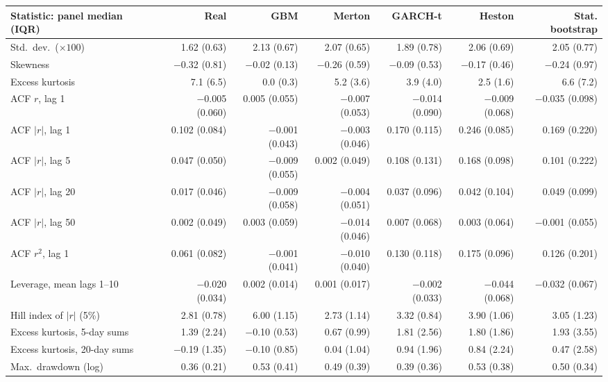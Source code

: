 \begin{tabular}{lrrrrrr}
\toprule
Statistic: panel median (IQR) & Real & GBM & Merton & GARCH-t & Heston & Stat. bootstrap \\
\midrule
Std.\ dev.\ ($\times 100$) & 1.62 (0.63) & 2.13 (0.67) & 2.07 (0.65) & 1.89 (0.78) & 2.06 (0.69) & 2.05 (0.77) \\
Skewness & $-$0.32 (0.81) & $-$0.02 (0.13) & $-$0.26 (0.59) & $-$0.09 (0.53) & $-$0.17 (0.46) & $-$0.24 (0.97) \\
Excess kurtosis & 7.1 (6.5) & 0.0 (0.3) & 5.2 (3.6) & 3.9 (4.0) & 2.5 (1.6) & 6.6 (7.2) \\
ACF $r$, lag 1 & $-$0.005 (0.060) & 0.005 (0.055) & $-$0.007 (0.053) & $-$0.014 (0.090) & $-$0.009 (0.068) & $-$0.035 (0.098) \\
ACF $|r|$, lag 1 & 0.102 (0.084) & $-$0.001 (0.043) & $-$0.003 (0.046) & 0.170 (0.115) & 0.246 (0.085) & 0.169 (0.220) \\
ACF $|r|$, lag 5 & 0.047 (0.050) & $-$0.009 (0.055) & 0.002 (0.049) & 0.108 (0.131) & 0.168 (0.098) & 0.101 (0.222) \\
ACF $|r|$, lag 20 & 0.017 (0.046) & $-$0.009 (0.058) & $-$0.004 (0.051) & 0.037 (0.096) & 0.042 (0.104) & 0.049 (0.099) \\
ACF $|r|$, lag 50 & 0.002 (0.049) & 0.003 (0.059) & $-$0.014 (0.046) & 0.007 (0.068) & 0.003 (0.064) & $-$0.001 (0.055) \\
ACF $r^2$, lag 1 & 0.061 (0.082) & $-$0.001 (0.041) & $-$0.010 (0.040) & 0.130 (0.118) & 0.175 (0.096) & 0.126 (0.201) \\
Leverage, mean lags 1--10 & $-$0.020 (0.034) & 0.002 (0.014) & 0.001 (0.017) & $-$0.002 (0.033) & $-$0.044 (0.068) & $-$0.032 (0.067) \\
Hill index of $|r|$ (5\%) & 2.81 (0.78) & 6.00 (1.15) & 2.73 (1.14) & 3.32 (0.84) & 3.90 (1.06) & 3.05 (1.23) \\
Excess kurtosis, 5-day sums & 1.39 (2.24) & $-$0.10 (0.53) & 0.67 (0.99) & 1.81 (2.56) & 1.80 (1.86) & 1.93 (3.55) \\
Excess kurtosis, 20-day sums & $-$0.19 (1.35) & $-$0.10 (0.85) & 0.04 (1.04) & 0.94 (1.96) & 0.84 (2.24) & 0.47 (2.58) \\
Max.\ drawdown (log) & 0.36 (0.21) & 0.53 (0.41) & 0.49 (0.39) & 0.39 (0.36) & 0.53 (0.38) & 0.50 (0.34) \\
\bottomrule
\end{tabular}

